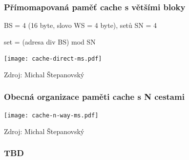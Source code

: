 \documentclass{beamer}
\begin{document}
\begin{frame}
\frametitle{Přímomapovaná paměť cache s většími bloky}

BS = 4 (16 byte, slovo WS = 4 byte), setů SN = 4

set = (adresa div BS) mod SN

{
\centering

\texttt{[image: cache-direct-ms.pdf]}

}

{\tiny Zdroj: Michal Štepanovský}
\end{frame}

\begin{frame}
\frametitle{Obecná organizace paměti cache s N cestami}

{
\centering

\texttt{[image: cache-n-way-ms.pdf]}

}

{\tiny Zdroj: Michal Štepanovský}

\end{frame}

\begin{frame}
\frametitle{TBD}
\end{frame}
\end{document}
